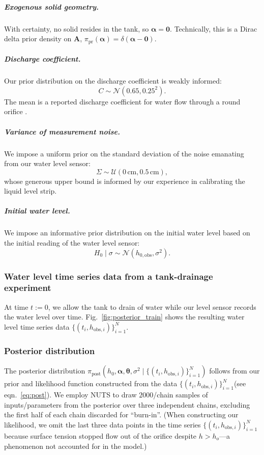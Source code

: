 \documentclass[a4paper,fleqn]{cas-dc}
\newcommand\thedata {$\{(t_i,h_{\text{obs}, i})\}_{i=1}^{N}$\xspace}
\newcommand\thedatanomath {\{(t_i,h_{\text{obs}, i})\}_{i=1}^{N}}
\begin{document}
\subparagraph{Exogenous solid geometry.}
With certainty, no solid resides in the tank, so $\boldsymbol \alpha=\mathbf{0}$. Technically, this is a Dirac delta prior density on $\mathbf{A}$, $\pi_{\text{pr}}(\boldsymbol \alpha)=\delta(\boldsymbol \alpha - \mathbf{0})$. 





\subparagraph{Discharge coefficient.} 
Our prior distribution on the discharge coefficient is weakly informed:
\begin{equation}
	C \sim \mathcal{N}(0.65, 0.25^2).
\end{equation} The mean is a reported discharge coefficient for water flow through a round orifice \cite{hicks2014determining}. 


\subparagraph{Variance of measurement noise.} 
We impose a uniform prior on the standard deviation of the noise emanating from our water level sensor:
\begin{equation}
\Sigma \sim \mathcal{U}(0\,\text{cm}, 0.5\,\text{cm}),
\end{equation} whose generous upper bound is informed by our experience in calibrating the liquid level strip. 


\subparagraph{Initial water level.} We impose an informative prior distribution on the initial water level based on the initial reading of the water level sensor:
\begin{equation}
	H_0 \mid \sigma \sim \mathcal{N}(h_{0, \text{obs}}, \sigma^2).
\end{equation} 


\subsubsection{Water level time series data from a tank-drainage experiment} At time $t:=0$, we allow the tank to drain of water while our level sensor records the water level over time. 
Fig.~\ref{fig:posterior_train} shows the resulting water level time series data \thedata.

\subsubsection{Posterior distribution}
The posterior distribution $\pi_{\text{post}}(h_0, \boldsymbol \alpha, \boldsymbol \theta, \sigma^2 \mid \thedatanomath)$ follows from our prior and likelihood function constructed from the data \thedata (see eqn.~\ref{eq:post}). 
We employ NUTS to draw $2000$/chain samples of inputs/parameters from the posterior over three independent chains, excluding the first half of each chain discarded for ``burn-in''. 
(When constructing our likelihood, we omit the last three data points in the time series \thedata because surface tension stopped flow out of the orifice despite $h>h_o$---a phenomenon not accounted for in the model.)
\end{document}
